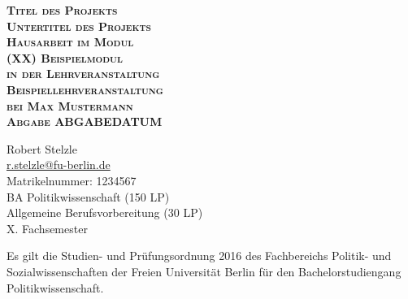 \documentclass[
  fontsize=11pt,
  parskip=half-, %
  english,ngerman,
  paper=a4,
  usegeometry, %
  toc=listof,
  captions=tableabove,
  bibliography=totoc, %
]{scrartcl}
\begin{document}
	
	
\begin{titlepage}
	\begin{center}
		\sffamily
		\vspace*{1.5cm}
		\Huge\bfseries\scshape
		Titel des Projekts\\
		\Large
		Untertitel des Projekts\\[3cm]
		\vspace*{0.2cm}
		\normalsize\mdseries\upshape
		Hausarbeit im Modul\\
		\large (XX) Beispielmodul\\
		\normalsize\mdseries\upshape
		in der Lehrveranstaltung\\
		\large Beispiellehrveranstaltung\\
		\normalsize bei Max Mustermann\\
		\large Abgabe ABGABEDATUM
		
		\vfill
		\upshape\Large
		Robert Stelzle\\
		\mdseries
		\url{r.stelzle@fu-berlin.de}\\[1ex]%
		\normalsize
		Matrikelnummer: 1234567\\[1cm]
		BA Politikwissenschaft (150 LP)\\
		Allgemeine Berufsvorbereitung (30 LP)\\
		X. Fachsemester\\[1cm]
		\begin{minipage}[c]{0.65\linewidth}
			\centering Es gilt die Studien- und Prüfungsordnung 2016 des Fachbereichs Politik- und 
			Sozialwissenschaften der Freien Universität Berlin für den Bachelorstudiengang 
			Politikwissenschaft. 
		\end{minipage}
		
		
	\end{center}
\end{titlepage}
\restoregeometry
\setcounter{page}{1}


\tableofcontents
\newpage


\end{document}
